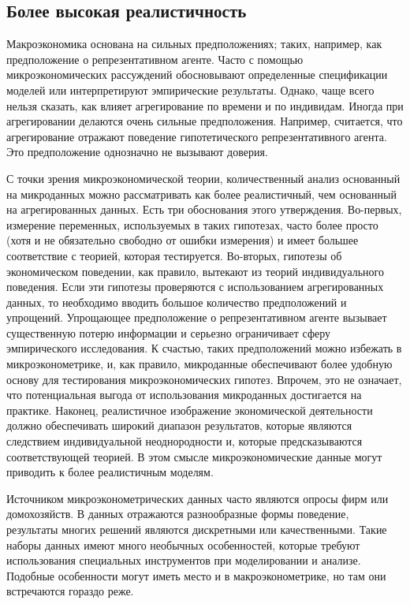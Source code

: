 \subsection{Более высокая реалистичность}


Макроэкономика основана на сильных предположениях; таких, например, как предположение о репрезентативном агенте. Часто с помощью микроэкономических рассуждений обосновывают определенные спецификации моделей   или интерпретируют эмпирические результаты. 
Однако, чаще всего нельзя сказать, как влияет агрегирование по времени и по индивидам. Иногда при агрегировании делаются очень сильные предположения. Например, считается, что агрегирование отражают поведение гипотетического репрезентативного агента. Это предположение  однозначно не вызывают доверия.
	
С точки зрения микроэкономической теории, количественный анализ основанный на микроданных можно рассматривать как более реалистичный, чем  основанный на агрегированных данных. 
Есть три обоснования этого утверждения. Во-первых, измерение переменных, используемых в таких гипотезах, часто более просто (хотя и не обязательно свободно от ошибки измерения) и имеет большее соответствие с теорией, которая тестируется. 
Во-вторых, гипотезы об экономическом поведении, как правило, вытекают из теорий индивидуального поведения. Если эти гипотезы проверяются с использованием агрегированных данных, то необходимо вводить большое количество предположений и упрощений. Упрощающее предположение о репрезентативном агенте вызывает существенную потерю информации и серьезно ограничивает сферу эмпирического исследования. К счастью, таких предположений можно избежать в микроэконометрике, и, как правило,   микроданные обеспечивают более удобную основу для тестирования микроэкономических гипотез. Впрочем, это не означает, что потенциальная выгода от использования микроданных достигается на практике. 
Наконец, реалистичное изображение экономической деятельности должно обеспечивать широкий диапазон результатов, которые являются следствием индивидуальной неоднородности и, которые предсказываются соответствующей теорией. В этом смысле микроэкономические данные могут приводить к более реалистичным моделям.
	
	
Источником микроэконометрических данных часто являются опросы фирм или домохозяйств. В данных отражаются разнообразные формы поведение, результаты многих решений являются дискретными или качественными.  Такие наборы данных имеют много необычных  особенностей, которые требуют использования специальных инструментов при моделировании и анализе. Подобные особенности могут иметь место и в макроэконометрике, но там они встречаются гораздо реже.


